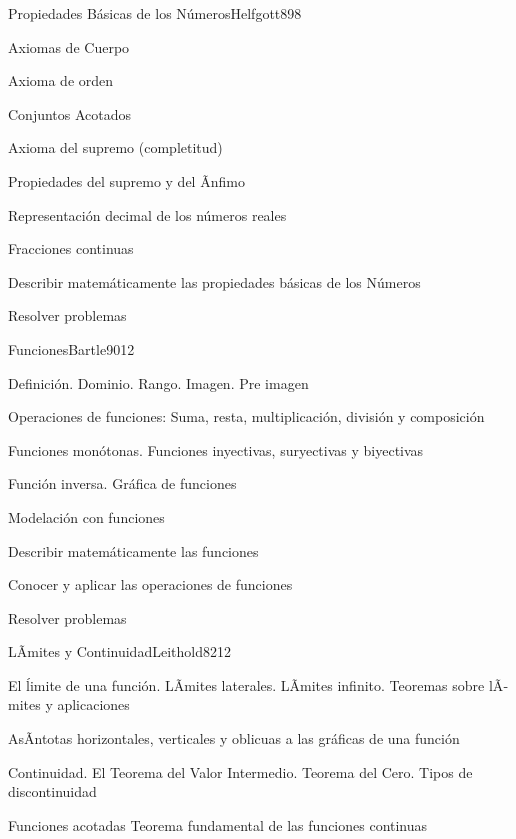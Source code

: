 \begin{syllabus}
\begin{unit}{Propiedades Básicas de los Números}{Helfgott89}{8}
\begin{topics}
	\item Axiomas de Cuerpo
	\item Axioma de orden
	\item Conjuntos Acotados
	\item Axioma del supremo  (completitud)
	\item Propiedades del supremo y del Ã­nfimo
	\item Representación decimal de los números reales
	\item Fracciones continuas
\end{topics}
\begin{unitgoals}
	\item Describir matemáticamente las propiedades básicas de los Números
	\item Resolver problemas
\end{unitgoals}
\end{unit}

\begin{unit}{Funciones}{Bartle90}{12}
\begin{topics}
      \item Definición. Dominio. Rango. Imagen. Pre imagen
      \item Operaciones de funciones: Suma, resta, multiplicación, división y composición
      \item Funciones monótonas. Funciones inyectivas,  suryectivas y biyectivas
      \item Función inversa. Gráfica de funciones
      \item Modelación con funciones
\end{topics}

   \begin{unitgoals}
      \item Describir matemáticamente las funciones
      \item Conocer y aplicar las operaciones de funciones
	\item Resolver problemas
   \end{unitgoals}
\end{unit}

\begin{unit}{LÃ­mites y Continuidad}{Leithold82}{12}
\begin{topics}
      \item El \'limite de una función. LÃ­mites laterales. LÃ­mites  infinito. Teoremas sobre lÃ­mites y aplicaciones
      \item AsÃ­ntotas horizontales, verticales y oblicuas a las gráficas de una función
      \item Continuidad. El Teorema del Valor Intermedio. Teorema del Cero. Tipos de discontinuidad
      \item Funciones acotadas Teorema fundamental de las funciones continuas
	\end{topics}


\end{unit}
\end{syllabus}
